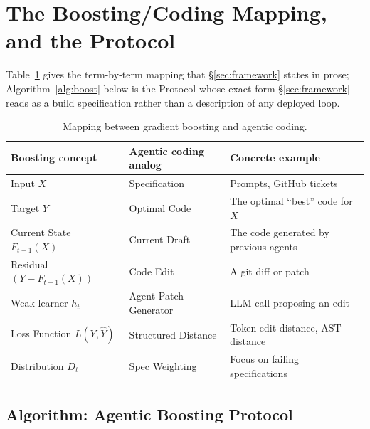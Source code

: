 
\appendix

\section{The Boosting/Coding Mapping, and the Protocol}
\label{app:mapping}

Table~\ref{tab:mapping} gives the term-by-term mapping that \S\ref{sec:framework} states in prose; Algorithm~\ref{alg:boost} below is the Protocol whose exact form \S\ref{sec:framework} reads as a build specification rather than a description of any deployed loop.

\begin{table}[h]
\centering
\small
\begin{tabular}{lll}
\toprule
\textbf{Boosting concept} & \textbf{Agentic coding analog} & \textbf{Concrete example} \\
\midrule
Input $X$ & Specification & Prompts, GitHub tickets \\
Target $Y$ & Optimal Code & The optimal ``best'' code for $X$ \\
Current State $F_{t-1}(X)$ & Current Draft & The code generated by previous agents \\
Residual $(Y - F_{t-1}(X))$ & Code Edit & A git diff or patch \\
Weak learner $h_t$ & Agent Patch Generator & LLM call proposing an edit \\
Loss Function $L(Y, \hat{Y})$ & Structured Distance & Token edit distance, AST distance \\
Distribution $D_t$ & Spec Weighting & Focus on failing specifications \\
\bottomrule
\end{tabular}
\caption{Mapping between gradient boosting and agentic coding.}
\label{tab:mapping}
\end{table}

\subsection{Algorithm: Agentic Boosting Protocol}
\label{app:algorithm}


